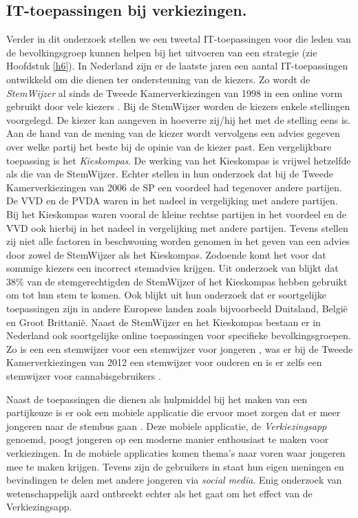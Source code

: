 \subsection{IT-toepassingen bij verkiezingen.}
Verder in dit onderzoek stellen we een tweetal IT-toepassingen voor die leden van de bevolkingsgroep kunnen helpen bij het uitvoeren van een strategie (zie Hoofdstuk \ref{h6}). In Nederland zijn er de laatste jaren een aantal IT-toepassingen ontwikkeld om die dienen ter ondersteuning van de kiezers. Zo wordt de \textit{StemWijzer} al sinds de Tweede Kamerverkiezingen van 1998 in een online vorm gebruikt door vele kiezers \citep{kleinnijenhuis2007nederland}. Bij de StemWijzer worden de kiezers enkele stellingen voorgelegd. De kiezer kan aangeven in hoeverre zij/hij het met de stelling eens is. Aan de hand van de mening van de kiezer wordt vervolgens een advies gegeven over welke partij het beste bij de opinie van de kiezer past. Een vergelijkbare toepassing is het \textit{Kieskompas}. De werking van het Kieskompas is vrijwel hetzelfde als die van de StemWijzer. Echter stellen \cite{kleinnijenhuis2007nederland} in hun onderzoek dat bij de Tweede Kamerverkiezingen van 2006 de SP een voordeel had tegenover andere partijen. De VVD en de PVDA waren in het nadeel in vergelijking met andere partijen. Bij het Kieskompas waren vooral de kleine rechtse partijen in het voordeel en de VVD ook hierbij in het nadeel in vergelijking met andere partijen. Tevens stellen zij niet alle factoren in beschwouing worden genomen in het geven van een advies door zowel de StemWijzer als het Kieskompas. Zodoende komt het voor dat sommige kiezers een incorrect stemadvies krijgen. Uit onderzoek van \cite{garzia2012voting} blijkt dat 38\% van de stemgerechtigden de StemWijzer of het Kieskompas hebben gebruikt om tot hun stem te komen. Ook blijkt uit hun onderzoek dat er soortgelijke toepassingen zijn in andere Europese landen zoals bijvoorbeeld Duitsland, Belgi\"{e} en Groot Brittani\"{e}. Naast de StemWijzer en het Kieskompas bestaan er in Nederland ook soortgelijke online toepassingen voor specifieke bevolkingsgroepen. Zo is een een stemwijzer voor een stemwijzer voor jongeren \citep{Jonge36:online}, was er bij de Tweede Kamerverkiezingen van 2012 een stemwijzer voor ouderen \citep{Stemw79:online,Stemw68:online} en is er zelfs een stemwijzer voor cannabisgebruikers \citep{Canna56:online}.

Naast de toepassingen die dienen als hulpmiddel bij het maken van een partijkeuze is er ook een mobiele applicatie die ervoor moet zorgen dat er meer jongeren naar de stembus gaan \citep{Verki80:online}. Deze mobiele applicatie, de \textit{Verkiezingsapp} genoemd, poogt jongeren op een moderne manier enthousiast te maken voor verkiezingen. In de mobiele applicaties komen thema's naar voren waar jongeren mee te maken krijgen. Tevens zijn de gebruikers in staat hun eigen meningen en bevindingen te delen met andere jongeren via \textit{social media}. Enig onderzoek van wetenschappelijk aard ontbreekt echter als het gaat om het effect van de Verkiezingsapp. 

